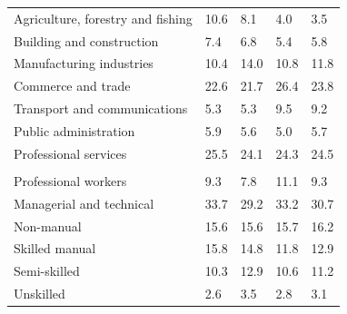 \documentclass{article}
\begin{document}
\begin{table}[h]
\begin{tabular}{KTTTT}
    \hline
Agriculture, forestry and fishing  & 10.6&  8.1&  4.0&  3.5\\
Building and construction & 7.4& 6.8& 5.4& 5.8\\
Manufacturing industries & 10.4& 14.0& 10.8& 11.8\\
Commerce and trade  & 22.6& 21.7& 26.4& 23.8\\
Transport and communications  & 5.3& 5.3& 9.5& 9.2\\
Public administration & 5.9& 5.6& 5.0& 5.7\\
Professional services & 25.5& 24.1& 24.3& 24.5\\
\hline
    \\ 
    \hline
Professional workers  &  9.3&  7.8 & 11.1&  9.3\\
Managerial and technical & 33.7& 29.2& 33.2& 30.7\\
Non-manual & 15.6& 15.6& 15.7& 16.2\\
Skilled manual & 15.8& 14.8& 11.8& 12.9\\
Semi-skilled & 10.3& 12.9& 10.6& 11.2\\
Unskilled  & 2.6& 3.5& 2.8& 3.1\\
\end{tabular}
\end{table}
\pagebreak
\end{document}
